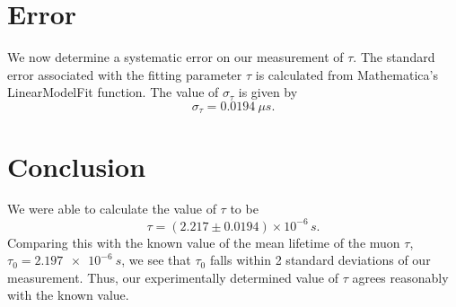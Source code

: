 \documentclass[aps, reprint,amsmath,amssymb]{revtex4-1} %
\begin{document}
\section{Error}
We now determine a systematic error on our measurement of $\tau$. The standard error associated with the fitting parameter $\tau$ is calculated from Mathematica's LinearModelFit function. The value of $\sigma_{\tau}$ is given by
\[
	\sigma_{\tau} = \SI{0.0194}{\mu s}.
\]

\section{Conclusion}

We were able to calculate the value of $\tau$ to be
\[
    \tau = (2.217 \pm 0.0194) \times 10^{-6} \,\si{s}.
\]
Comparing this with the known value of the mean lifetime of the muon $\tau$, $\tau_0 = \SI{2.197e-6}{s}$, we see that $\tau_0$ falls within 2 standard deviations of our measurement.
Thus, our experimentally determined value of $\tau$ agrees reasonably with the
known value.
\end{document}
